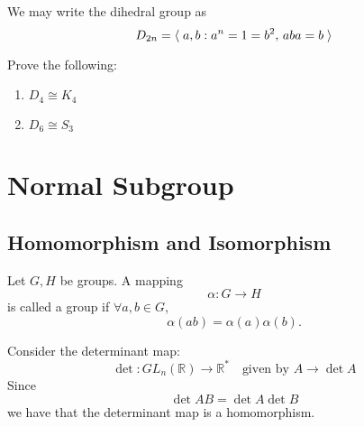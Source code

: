 \begin{eg}
  We may write the dihedral group as
  \begin{equation*}
    D_{2n} = \langle \;  a, b : a^n = 1 = b^2, \, aba = b  \; \rangle
  \end{equation*}
\end{eg}

\begin{ex}
  Prove the following:
  \begin{enumerate}
    \item $D_4 \cong K_4$
    \item $D_6 \cong S_3$
  \end{enumerate}
\end{ex}



\section{Normal Subgroup}%
\label{sec:normal_subgroup}

\subsection{Homomorphism and Isomorphism}%
\label{sub:homomorphism_and_isomorphism}

\begin{defn}
\label{defn:group_homomorphism}
  Let $G, H$ be groups. A mapping
  \begin{equation*}
    \alpha : G \to H
  \end{equation*}
  is called a group  if $\forall a, b \in G$,
  \begin{equation*}
    \alpha(ab) = \alpha(a)\alpha(b).
  \end{equation*}
\end{defn}

\begin{eg}\label{eg:homomorphism_classical_eg}
  Consider the determinant map:
  \begin{equation*}
    \det : GL_n(\mathbb{R}) \to \mathbb{R}^* \quad \text{given by } A \to \det A
  \end{equation*}
  Since
  \begin{equation*}
    \det AB = \det A \det B
  \end{equation*}
  we have that the determinant map is a homomorphism.
\end{eg}

